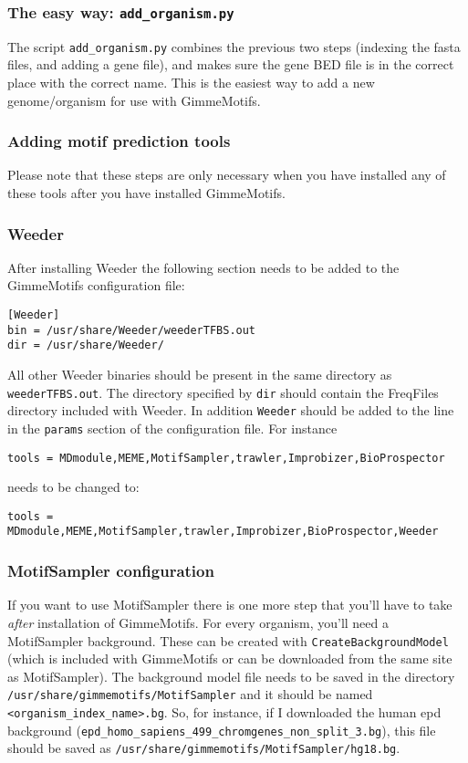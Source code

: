 \documentclass[11pt]{article}
\begin{document}
\subsubsection{The easy way: \texttt{add\_organism.py}}
The script \texttt{add\_organism.py} combines the previous two steps (indexing the fasta files, and adding a gene file), and makes sure the gene BED file is in the correct place with the correct name. This is the easiest way to add a new genome/organism for use with GimmeMotifs.

\subsubsection{Adding motif prediction tools} \label{sec:adding_tools}
Please note that these steps are only necessary when you have installed any of these tools after you have installed GimmeMotifs.

\subsubsection*{Weeder}
After installing Weeder the following section needs to be added to the GimmeMotifs configuration file:
\begin{verbatim}
[Weeder]
bin = /usr/share/Weeder/weederTFBS.out
dir = /usr/share/Weeder/ 
\end{verbatim}
All other Weeder binaries should be present in the same directory as \texttt{weederTFBS.out}. The directory specified by \texttt{dir} should contain the FreqFiles directory included with Weeder.
In addition \texttt{Weeder} should be added to the line in the \texttt{params} section of the configuration file. For instance 
\begin{verbatim}
tools = MDmodule,MEME,MotifSampler,trawler,Improbizer,BioProspector
\end{verbatim}
needs to be changed to:
\begin{verbatim}
tools = MDmodule,MEME,MotifSampler,trawler,Improbizer,BioProspector,Weeder
\end{verbatim}

\subsubsection{MotifSampler configuration}
\label{sec:MotifSampler}
If you want to use MotifSampler there is one more step that you'll have to take \emph{after} installation of GimmeMotifs. For every organism, you'll need a MotifSampler background. These can be created with \texttt{CreateBackgroundModel} (which is included with GimmeMotifs or can be downloaded from the same site as MotifSampler). The background model file needs to be saved in the directory \texttt{/usr/share/gimmemotifs/MotifSampler} and it should be named \texttt{<organism\_index\_name>.bg}. So, for instance, if I downloaded the human epd background (\texttt{epd\_homo\_sapiens\_499\_chromgenes\_non\_split\_3.bg}), this file should be saved as \texttt{/usr/share/gimmemotifs/MotifSampler/hg18.bg}.
\end{document}

